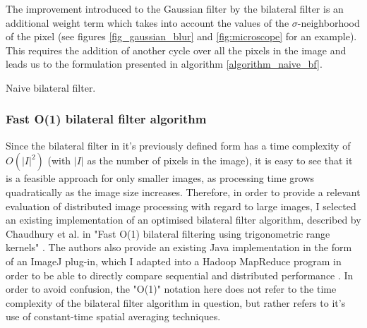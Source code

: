 \documentclass [12pt,a4paper]{report}
\begin{document}
The improvement introduced to the Gaussian filter by the bilateral filter is an additional weight term which takes into account the values of the $\sigma$-neighborhood of the pixel (see figures \ref{fig_gaussian_blur} and \ref{fig:microscope} for an example). This requires the addition of another cycle over all the pixels in the image and leads us to the formulation presented in algorithm \ref{algorithm_naive_bf}.

\begin{center}
\begin{algorithm}[H]
\caption{Naive bilateral filter.}
\label{algorithm_naive_bf}
\end{algorithm}
\end{center}

\subsubsection{Fast O(1) bilateral filter algorithm}

Since the bilateral filter in it's previously defined form has a time complexity of $O(|I|^2)$ (with $|I|$ as the number of pixels in the image), it is easy to see that it is a feasible approach for only smaller images, as processing time grows quadratically as the image size increases. Therefore, in order to provide a relevant evaluation of distributed image processing with regard to large images, I selected an existing implementation of an optimised bilateral filter algorithm, described by Chaudhury et al. in "Fast O(1) bilateral filtering using trigonometric range kernels" \cite{chaudhury2011fast}. The authors also provide an existing Java implementation in the form of an ImageJ plug-in, which I adapted into a Hadoop MapReduce program in order to be able to directly compare sequential and distributed performance \cite{imagej}. In order to avoid confusion, the "O(1)" notation here does not refer to the time complexity of the bilateral filter algorithm in question, but rather refers to it's use of constant-time spatial averaging techniques.
\end{document}
